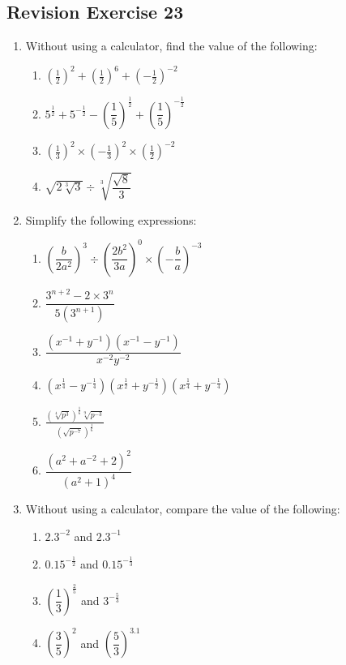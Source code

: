 \documentclass[12pt]{report}
\begin{document}
\subsection*{Revision Exercise 23}
\setlength{\columnseprule}{1pt}
\setlength{\columnsep}{24pt}
\begin{multicols}{2}
  \begin{enumerate}
    \item Without using a calculator, find the value of the following:
          \begin{enumerate}
            \item $\left({\frac{1}{2}}\right)^{2}+\left({\frac{1}{2}}\right)^{6}+\left(-{\frac{1}{2}}\right)^{-2}$
            \item $5^{\frac{1}{2}}+5^{-{\frac{1}{2}}}-\left(\dfrac{1}{5}\right)^{\frac{1}{2}}+\left(\dfrac{1}{5}\right)^{-{\frac{1}{2}}}$
            \item $\left({\frac{1}{3}}\right)^{2}\times\left(-{\frac{1}{3}}\right)^{2}\times\left({\frac{1}{2}}\right)^{-2}$
            \item ${\sqrt{2{\sqrt[3]{3}}}}\div{\sqrt[3]{\dfrac{\sqrt{8}}{3}}}$
          \end{enumerate}

    \item Simplify the following expressions:
          \begin{enumerate}
            \item $\left({\dfrac{b}{2a^{2}}}\right)^{3}\div\left({\dfrac{2b^{2}}{3a}}\right)^{0}\times\left(-{\dfrac{b}{a}}\right)^{-3}$
            \item $\dfrac{3^{n+2}-2\times3^{n}}{5(3^{n+1})}$
            \item $\dfrac{\left(x^{-1}+y^{-1}\right)\left(x^{-1}-y^{-1}\right)}{x^{-2}y^{-2}}$
            \item $\left({x^{\frac{1}{4}}}-y^{-{\frac{1}{4}}}\right)\left(x^{\frac{1}{2}}+y^{-{\frac{1}{2}}}\right)\left(x^{\frac{1}{4}}+y^{-{\frac{1}{4}}}\right)$
            \item $\frac{\left({\sqrt[4]{p^{3}}}\right)^{\frac{1}{6}}{\sqrt[9]{p^{-3}}}}{\left(\sqrt{p^{-7}}\right)^{\frac{1}{6}}}$
            \item $\dfrac{\left(a^{2}+a^{-2}+2\right)^{2}}{\left(a^{2}+1\right)^{4}}$
          \end{enumerate}

    \item Without using a calculator, compare the value of the following:
          \begin{enumerate}
            \item $2.3^{-2}$ and $2.3^{-1}$
            \item $0.15^{-{\frac{1}{2}}}$ and ${0.15}^{-{\frac{1}{3}}}$
            \item $\left({\dfrac{1}{3}}\right)^{\frac{2}{5}}$ and $ 3^{-{\frac{5}{3}}}$
            \item $\left({\dfrac{3}{5}}\right)^{2}$ and $\left({\dfrac{5}{3}}\right)^{3.1}$
          \end{enumerate}


\end{enumerate}
\end{multicols}
\end{document}
